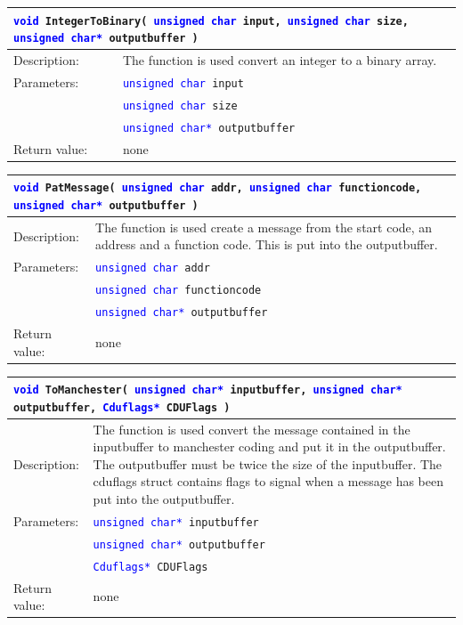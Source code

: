 \begin{table}[H]
\begin{tabular}{l p{12.5cm}}
\multicolumn{2}{p{15cm}}{\texttt{\textcolor{blue}{void} IntegerToBinary( \texttt{\textcolor{blue}{unsigned char} input, \textcolor{blue}{unsigned char} size, \textcolor{blue}{unsigned char*} outputbuffer  }) } } \\
\hline
Description:& The function is used convert an integer to a binary array.\\
Parameters:&\texttt{\textcolor{blue}{unsigned char} input}\\
&\texttt{\textcolor{blue}{unsigned char} size}\\
&\texttt{\textcolor{blue}{unsigned char*} outputbuffer}\\
Return value:&none\\
\end{tabular}
\end{table}

\begin{table}[H]
\begin{tabular}{l p{12.5cm}}
\multicolumn{2}{p{15cm}}{\texttt{\textcolor{blue}{void} PatMessage( \texttt{\textcolor{blue}{unsigned char} addr, \textcolor{blue}{unsigned char} functioncode, \textcolor{blue}{unsigned char*} outputbuffer  }) } } \\
\hline
Description:& The function is used create a message from the start code, an address and a function code. This is put into the outputbuffer.\\
Parameters:&\texttt{\textcolor{blue}{unsigned char} addr}\\
&\texttt{\textcolor{blue}{unsigned char} functioncode}\\
&\texttt{\textcolor{blue}{unsigned char*} outputbuffer}\\
Return value:&none\\
\end{tabular}
\end{table}

\begin{table}[H]
\begin{tabular}{l p{12.5cm}}
\multicolumn{2}{p{15cm}}{\texttt{\textcolor{blue}{void} ToManchester( \texttt{\textcolor{blue}{unsigned char*} inputbuffer, \textcolor{blue}{unsigned char*} outputbuffer, \textcolor{blue}{Cduflags*} CDUFlags  }) } } \\
\hline
Description:& The function is used convert the message contained in the inputbuffer to manchester coding and put it in the outputbuffer. The outputbuffer must be twice the size of the inputbuffer. The cduflags struct contains flags to signal when a message has been put into the outputbuffer.\\
Parameters:&\texttt{\textcolor{blue}{unsigned char*} inputbuffer}\\
&\texttt{\textcolor{blue}{unsigned char*} outputbuffer}\\
&\texttt{\textcolor{blue}{Cduflags*} CDUFlags}\\
Return value:&none\\
\end{tabular}
\end{table}

